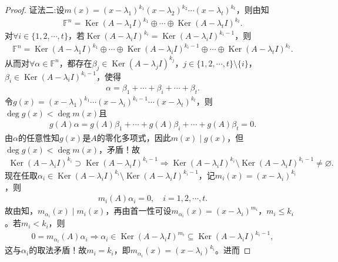 \documentclass[../../main.tex]{subfiles}%
\begin{document}
\begin{proof}
{\color{blue}证法二:}设$m(x)=(x-\lambda_1)^{k_1}(x-\lambda_2)^{k_2}\cdots(x-\lambda_t)^{k_t}$，则由知
\begin{align}
\mathbb{F}^n=\operatorname{Ker}(A-\lambda_1I)^{k_1}\oplus\cdots\oplus\operatorname{Ker}(A-\lambda_tI)^{k_t}.\label{eq::--2r89fujfis9fj23ojcoszjfojpj3fgsdhdsw211}
\end{align}
对$\forall i\in\{1,2,\cdots,t\}$，若$\operatorname{Ker}(A-\lambda_iI)^{k_i}=\operatorname{Ker}(A-\lambda_iI)^{k_i-1}$，则
\begin{align*}
\mathbb{F}^n=\operatorname{Ker}(A-\lambda_1I)^{k_1}\oplus\cdots\oplus\operatorname{Ker}(A-\lambda_iI)^{k_i-1}\oplus\cdots\oplus\operatorname{Ker}(A-\lambda_tI)^{k_t}.
\end{align*}
从而对$\forall \alpha\in\mathbb{F}^n$，都存在$\beta_j\in\operatorname{Ker}(A-\lambda_jI)^{k_j}$，$j\in\{1,2,\cdots,t\}\setminus\{i\}$，$\beta_i\in\operatorname{Ker}(A-\lambda_iI)^{k_i-1}$，使得
\begin{align*}
\alpha=\beta_1+\cdots+\beta_i+\cdots+\beta_t.
\end{align*}
令$g(x)=(x-\lambda_1)^{k_1}\cdots(x-\lambda_i)^{k_i-1}\cdots(x-\lambda_t)^{k_t}$，则$\deg g(x)<\deg m(x)$且
\begin{align*}
g(A)\alpha=g(A)\beta_1+\cdots+g(A)\beta_i+\cdots+g(A)\beta_t=0.
\end{align*}
由$\alpha$的任意性知$g(x)$是$A$的零化多项式，因此$m(x)\mid g(x)$，但$\deg g(x)<\deg m(x)$，矛盾！故
\begin{align*}
\operatorname{Ker}(A-\lambda_iI)^{k_i}\supset\operatorname{Ker}(A-\lambda_iI)^{k_i-1}\Longrightarrow\operatorname{Ker}(A-\lambda_iI)^{k_i}\setminus\operatorname{Ker}(A-\lambda_iI)^{k_i-1}\neq\varnothing.
\end{align*}
现在任取$\alpha_i\in\operatorname{Ker}(A-\lambda_iI)^{k_i}\setminus\operatorname{Ker}(A-\lambda_iI)^{k_i-1}$，记$m_i(x)=(x-\lambda_i)^{k_i}$，则
\begin{align*}
m_i(A)\alpha_i=0,\quad i=1,2,\cdots,t.
\end{align*}
故由知，$m_{\alpha_i}(x)\mid m_i(x)$，再由首一性可设$m_{\alpha_i}(x)=(x-\lambda_i)^{m_i}$，$m_i\leqslant k_i$。若$m_i<k_i$，则
\begin{align*}
0=m_{\alpha_i}(A)\alpha_i\Longrightarrow\alpha_i\in\operatorname{Ker}(A-\lambda_iI)^{m_i}\subseteq\operatorname{Ker}(A-\lambda_iI)^{k_i-1},
\end{align*}
这与$\alpha_i$的取法矛盾！故$m_i=k_i$，即$m_{\alpha_i}(x)=(x-\lambda_i)^{k_i}$。进而

\end{proof}
\end{document}
